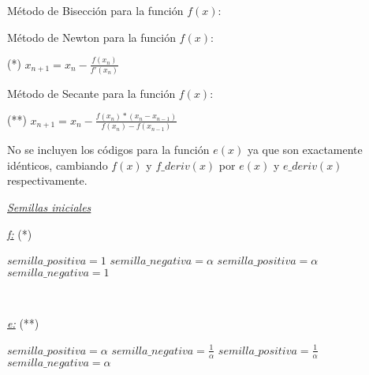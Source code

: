 M\'etodo de Bisección para la funci\'on $f(x)$:

\tiny{

}

\normalsize{M\'etodo de Newton para la funci\'on $f(x)$:}

\tiny{}

\normalsize
(*) $x_{n+1} = x_{n} - \frac{f(x_{n})}{f'(x_{n})}$

M\'etodo de Secante para la funci\'on $f(x)$:

\tiny{

}

\normalsize
(**) $x_{n+1} = x_{n} - \frac{f(x_{n})*(x_{n}-x_{n-1})}{f(x_{n})-f(x_{n-1})}$

No se incluyen los c\'odigos para la funci\'on $e(x)$ ya que son exactamente id\'enticos, cambiando $f(x)$ y $f\_deriv(x)$ por $e(x)$ y $e\_deriv(x)$ respectivamente.

\tiny{

}

\normalsize

\underline{\emph{Semillas iniciales}}

\underline{\emph{f:}} (*)

\begin{algorithmic} 
		\State $semilla\_positiva = 1$
		\State $semilla\_negativa = \alpha$
	\Else
		\State $semilla\_positiva = \alpha$
		\State $semilla\_negativa = 1$
	\EndIf
\end{algorithmic}

~

\underline{\emph{e:}} (**)

\begin{algorithmic} 
		\State $semilla\_positiva = \alpha$
		\State $semilla\_negativa = \frac{1}{\alpha}$
	\Else
		\State $semilla\_positiva = \frac{1}{\alpha}$
		\State $semilla\_negativa = \alpha$
	\EndIf
\end{algorithmic}

